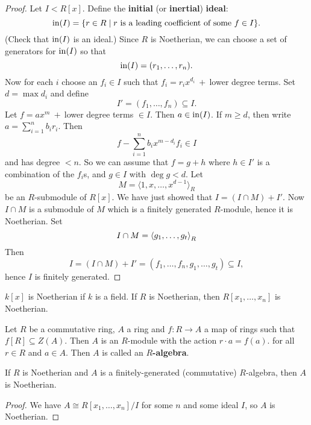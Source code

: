 \begin{proof}
  Let $I<R[x]$.
  Define the \textbf{initial} (or \textbf{inertial}) \textbf{ideal}:
  \[ \operatorname{in}(I) = \{ r \in R \mid r \text{ is a leading coefficient of some }f \in I \}. \]
  (Check that $\operatorname{in}(I)$ is an ideal.)
  Since $R$ is Noetherian, we can choose a set of generators for $\operatorname{in}(I)$ so that
  \[ \operatorname{in}(I) = (r_1,\ldots,r_n). \]
  Now for each $i$ choose an $f_i \in I$ such that $f_i = r_ix^{d_i}\ +\ $lower degree terms.
  Set $d=\max{d_i}$ and define
  \[ I' = (f_1,\ldots,f_n) \subseteq I. \]
  Let $f = ax^m\ +\ $lower degree terms $\in I$.
  Then $a \in \operatorname{in}(I)$.
  If $m \geq d$, then write $a = \sum_{i=1}^n b_ir_i$.
  Then
  \[ f - \sum_{i=1}^n b_i x^{m-d_i}f_i \in I \]
  and has degree $<n$.
  So we can assume that $f=g+h$ where $h \in I'$ is a combination of the $f_i$s, and $g \in I$ with $\deg g<d$.
  Let
  \[ M = \langle1,x,\ldots,x^{d-1}\rangle_R \]
  be an $R$-submodule of $R[x]$.
  We have just showed that $I = (I \cap M) + I'$.
  Now $I \cap M$ is a submodule of $M$ which is a finitely generated $R$-module, hence it is Noetherian.
  Set
  \[ I \cap M = {\left\langle g_1,\ldots,g_t \right\rangle}_R \]
  Then
  \[ I = (I \cap M) + I' = (f_1,\ldots,f_n,g_1,\ldots,g_t) \subseteq I, \]
  hence $I$ is finitely generated.
\end{proof}

\begin{cor}[3.18]
  \lv
  \begin{enum}
    \io $k[x]$ is Noetherian if $k$ is a field.
    \io If $R$ is Noetherian, then $R[x_1,\ldots,x_n]$ is Noetherian.
  \end{enum}
\end{cor}

\begin{defn}[3.20]
  Let $R$ be a commutative ring, $A$ a ring and $f: R \to A$ a map of rings such that $f[R] \subseteq Z(A)$.
  Then $A$ is an $R$-module with the action $r \cdot a = f(a)$. for all $r \in R$ and $a \in A$.
  Then $A$ is called an \textbf{$R$-algebra}.
\end{defn}

\begin{cor}[3.19]
  If $R$ is Noetherian and $A$ is a finitely-generated (commutative) $R$-algebra, then $A$ is Noetherian.
\end{cor}

\begin{proof}
  We have $A \cong R[x_1,\ldots,x_n]/I$ for some $n$ and some ideal $I$, so $A$ is Noetherian.
\end{proof}


